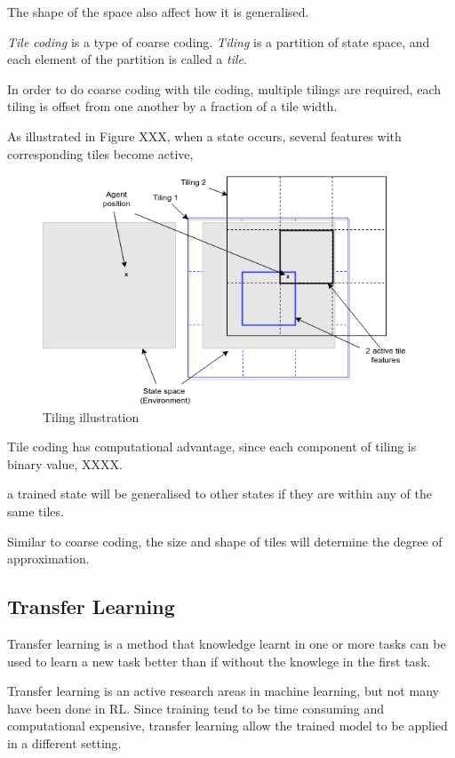 \documentclass[12pt,twoside]{report}
\theoremstyle{plain}
\theoremstyle{definition}
\begin{document}
The shape of the space also affect how it is generalised. 

\textit{Tile coding} is a type of coarse coding. \textit{Tiling} is a partition of state space, and each element of the partition is called a \textit{tile}. 

In order to do coarse coding with tile coding, multiple tilings are required, each tiling is offset from one another by a fraction of a tile width. 

As illustrated in Figure XXX, when a state occurs, several features with corresponding tiles become active, 

\begin{figure}[!htb]
\centering
\includegraphics[width=1.0\textwidth]{./figures/tile_coding}
\caption{Tiling illustration}
\label{dyna}
\end{figure}

Tile coding has computational advantage, since each component of tiling is binary value,  XXXX.

a trained state will be generalised to other states if they are within any of the same tiles. 

Similar to coarse coding, the size and shape of tiles will determine the degree of approximation. 

\subsection{Transfer Learning}
\label{transfer_learning}

Transfer learning is a method that knowledge learnt in one or more tasks can be used to learn a new task better than if without the knowlege in the first task. 

Transfer learning is an active research areas in machine learning, but not many have been done in RL. 
Since training tend to be time consuming and computational expensive, transfer learning allow the trained model to be applied in a different setting. 
\end{document}
